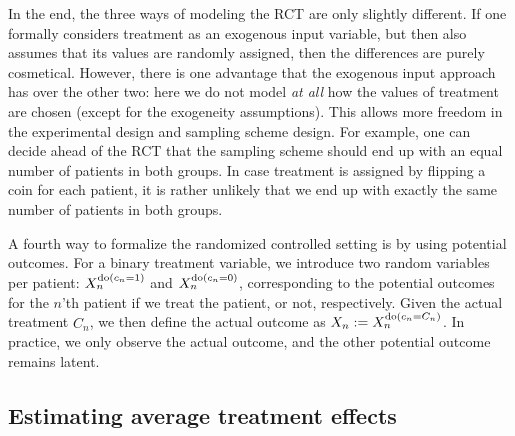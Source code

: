 In the end, the three ways of modeling the RCT are only slightly different. If one
formally considers treatment as an exogenous input variable, but then also assumes
that its values are randomly assigned, then the differences are purely cosmetical.
However, there is one advantage that the exogenous input approach has over the other
two: here we do not model \emph{at all} how the values of treatment are chosen
(except for the exogeneity assumptions). This allows more freedom in the experimental
design and sampling scheme design. For example, one can decide ahead of the RCT that 
the sampling scheme should end up with an equal number of patients in both groups. 
In case treatment is assigned by flipping a coin for each patient, it is rather unlikely
that we end up with exactly the same number of patients in both groups. 

A fourth way to formalize the randomized controlled setting is by using potential outcomes.
For a binary treatment variable, we introduce two random variables per patient:
$X^{\operatorname{do}(c_n=1)}_n$ and $X^{\operatorname{do}(c_n=0)}_n$, corresponding to the potential outcomes for
the $n$'th patient if we treat the patient, or not, respectively. 
Given the actual treatment $C_n$, we then define the actual outcome as 
$X_n := X_n^{\operatorname{do}(c_n=C_n)}$. In practice, we only observe the actual outcome, and the
other potential outcome remains latent. 


\subsection{Estimating average treatment effects}

